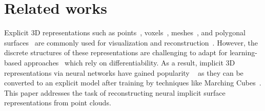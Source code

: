 \section{Related works}

Explicit 3D representations such as points~\cite{achlioptas2018learning}, voxels~\cite{tatarchenko2017octree}, meshes~\cite{fu2024lfs}, and polygonal surfaces~\cite{Nan_2017_ICCV} are commonly used for visualization and reconstruction~\cite{kazhdan2013screened}.
However, the discrete structures of these representations are challenging to adapt for learning-based approaches~\cite{takikawa2021neural,peng2020convoccnet} which rely on differentiability.
As a result, implicit 3D representations via neural networks have gained popularity ~\cite{park2019deepsdf} as they can be converted to an explicit model after training by techniques like Marching Cubes~\cite{lorensen1998marching}.
This paper addresses the task of reconstructing neural implicit surface representations from point clouds.


